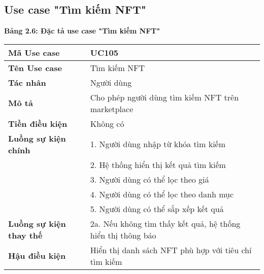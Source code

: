 \subsection{Use case "Tìm kiếm NFT"}
\textbf{Bảng 2.6: Đặc tả use case "Tìm kiếm NFT"}
\renewcommand{\arraystretch}{1.5}
\begin{tabular}{|l|p{10cm}|}
    \hline
    \rule{0pt}{3ex}\textbf{Mã Use case} & UC105 \\
    \hline
    \rule{0pt}{3ex}\textbf{Tên Use case} & Tìm kiếm NFT \\
    \hline
    \rule{0pt}{3ex}\textbf{Tác nhân} & Người dùng \\
    \hline
    \rule{0pt}{3ex}\textbf{Mô tả} & Cho phép người dùng tìm kiếm NFT trên marketplace \\
    \hline
    \rule{0pt}{3ex}\textbf{Tiền điều kiện} & Không có \\
    \hline
    \rule{0pt}{3ex}\textbf{Luồng sự kiện chính} & 1. Người dùng nhập từ khóa tìm kiếm \\
    & 2. Hệ thống hiển thị kết quả tìm kiếm \\
    & 3. Người dùng có thể lọc theo giá \\
    & 4. Người dùng có thể lọc theo danh mục \\
    & 5. Người dùng có thể sắp xếp kết quả \\
    \hline
    \rule{0pt}{3ex}\textbf{Luồng sự kiện thay thế} & 2a. Nếu không tìm thấy kết quả, hệ thống hiển thị thông báo \\
    \hline
    \rule{0pt}{3ex}\textbf{Hậu điều kiện} & Hiển thị danh sách NFT phù hợp với tiêu chí tìm kiếm \\
    \hline
\end{tabular}

